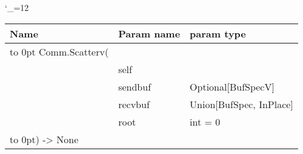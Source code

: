 \begingroup \catcode`\_=12 \tt
\begin{tabular}{lll}
\toprule
\textrm{Name}&\textrm{Param name}&\textrm{param type}\\
\midrule
\hbox to 0pt {Comm.Scatterv(\hss}\\
& self\\
& sendbuf & Optional[BufSpecV]\\
& recvbuf & Union[BufSpec, InPlace]\\
& root & int = 0\\
\hbox to 0pt{) -> None\hss}\\
\bottomrule
\end{tabular}
\endgroup
